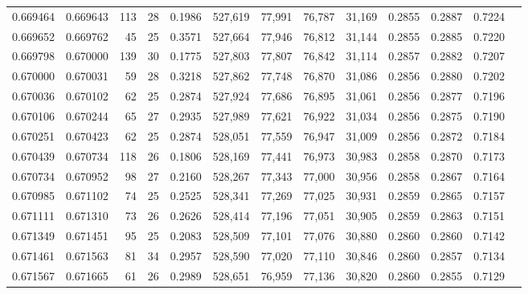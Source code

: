 \begin{tabular}{rrrrrrrrrrrrr}
0.669464 & 0.669643 &    113 &    28 &                                     0.1986 & 527,619 &  77,991 &  76,787 &  31,169 & 0.2855 & 0.2887 & 0.7224 \\
0.669652 & 0.669762 &     45 &    25 &                                     0.3571 & 527,664 &  77,946 &  76,812 &  31,144 & 0.2855 & 0.2885 & 0.7220 \\
0.669798 & 0.670000 &    139 &    30 &                                     0.1775 & 527,803 &  77,807 &  76,842 &  31,114 & 0.2857 & 0.2882 & 0.7207 \\
0.670000 & 0.670031 &     59 &    28 &                                     0.3218 & 527,862 &  77,748 &  76,870 &  31,086 & 0.2856 & 0.2880 & 0.7202 \\
0.670036 & 0.670102 &     62 &    25 &                                     0.2874 & 527,924 &  77,686 &  76,895 &  31,061 & 0.2856 & 0.2877 & 0.7196 \\
0.670106 & 0.670244 &     65 &    27 &                                     0.2935 & 527,989 &  77,621 &  76,922 &  31,034 & 0.2856 & 0.2875 & 0.7190 \\
0.670251 & 0.670423 &     62 &    25 &                                     0.2874 & 528,051 &  77,559 &  76,947 &  31,009 & 0.2856 & 0.2872 & 0.7184 \\
0.670439 & 0.670734 &    118 &    26 &                                     0.1806 & 528,169 &  77,441 &  76,973 &  30,983 & 0.2858 & 0.2870 & 0.7173 \\
0.670734 & 0.670952 &     98 &    27 &                                     0.2160 & 528,267 &  77,343 &  77,000 &  30,956 & 0.2858 & 0.2867 & 0.7164 \\
0.670985 & 0.671102 &     74 &    25 &                                     0.2525 & 528,341 &  77,269 &  77,025 &  30,931 & 0.2859 & 0.2865 & 0.7157 \\
0.671111 & 0.671310 &     73 &    26 &                                     0.2626 & 528,414 &  77,196 &  77,051 &  30,905 & 0.2859 & 0.2863 & 0.7151 \\
0.671349 & 0.671451 &     95 &    25 &                                     0.2083 & 528,509 &  77,101 &  77,076 &  30,880 & 0.2860 & 0.2860 & 0.7142 \\
0.671461 & 0.671563 &     81 &    34 &                                     0.2957 & 528,590 &  77,020 &  77,110 &  30,846 & 0.2860 & 0.2857 & 0.7134 \\
0.671567 & 0.671665 &     61 &    26 &                                     0.2989 & 528,651 &  76,959 &  77,136 &  30,820 & 0.2860 & 0.2855 & 0.7129 \\

\end{tabular}
